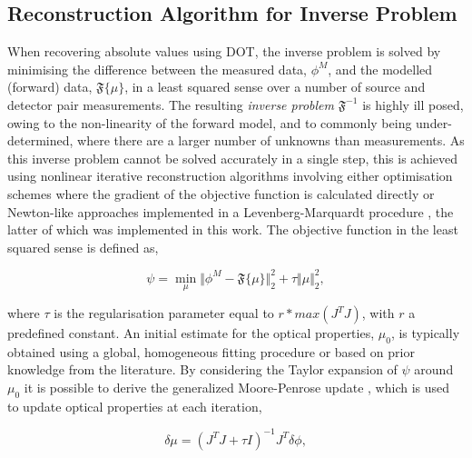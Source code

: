 \documentclass[twoside]{bhamthesis}
\theoremstyle{definition}
\begin{document}
\subsection{Reconstruction Algorithm for Inverse Problem}
\label{section:Reconstruction}

When recovering absolute values using DOT, the inverse problem is solved by minimising the difference between the measured data, $\phi^M$, and the modelled (forward) data, $\mathfrak{F} \lbrace \mu \rbrace $, in a least squared sense over a number of source and detector pair measurements. The resulting \textit{inverse problem} $\mathfrak{F}^{-1}$ is highly ill posed, owing to the non-linearity of the forward model, and to commonly being under-determined, where there are a larger number of unknowns than measurements. As this inverse problem cannot be solved accurately in a single step, this is achieved using nonlinear iterative reconstruction algorithms involving either optimisation schemes where the gradient of the objective function is calculated directly \cite{arridge1998gradient,hielscher1999gradient} or Newton-like approaches implemented in a Levenberg-Marquardt procedure \cite{jiang1996optical,dehghani2009near}, the latter of which was implemented in this work. The objective function in the least squared sense is defined as,

\begin{equation} 
 \psi = \min_{\mu} \Vert \phi^M - \mathfrak{F} \lbrace \mu \rbrace \Vert^2_2 + \tau \Vert \mu \Vert^2_2, 
  \label{eqn:ObjFun}
\end{equation}

where $\tau$ is the regularisation parameter equal to $r * max(J^T J)$, with $r$ a predefined constant. An initial estimate for the optical properties, $\mu_0$, is typically obtained using a global, homogeneous fitting procedure \cite{dehghani2003multiwavelength} or based on prior knowledge from the literature. By considering the Taylor expansion of $\psi$ around $\mu_0$ it is possible to derive the generalized Moore-Penrose update \cite{penrose1955generalized}, which is used to update optical properties at each iteration,  

\begin{equation} 
\delta \mu = (J^T J +\tau I)^{-1}J^T \delta \phi, 
  \label{eqn:Moore-penrose}
\end{equation}
\end{document}
